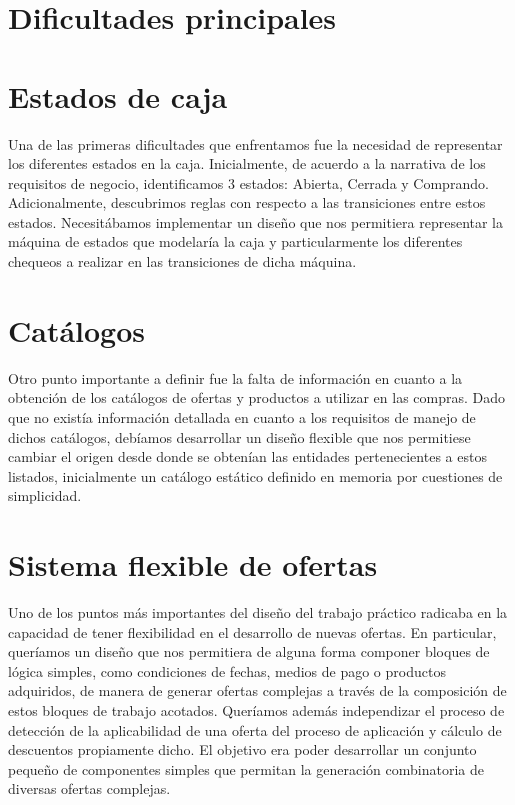 \documentclass[a4paper,11pt]{article}
\begin{document}
\section{Dificultades principales}

\section{Estados de caja}

Una de las primeras dificultades que enfrentamos fue la necesidad de
representar los diferentes estados en la caja. Inicialmente, de acuerdo a la
narrativa de los requisitos de negocio, identificamos 3 estados: Abierta,
Cerrada y Comprando. Adicionalmente, descubrimos reglas con respecto a las
transiciones entre estos estados. Necesitábamos implementar un diseño que nos
permitiera representar la máquina de estados que modelaría la caja y
particularmente los diferentes chequeos a realizar en las transiciones de dicha
máquina.

\section{Catálogos}

Otro punto importante a definir fue la falta de información en cuanto a la
obtención de los catálogos de ofertas y productos a utilizar en las compras.
Dado que no existía información detallada en cuanto a los requisitos de manejo
de dichos catálogos, debíamos desarrollar un diseño flexible que nos permitiese
cambiar el origen desde donde se obtenían las entidades pertenecientes a estos
listados, inicialmente un catálogo estático definido en memoria por cuestiones
de simplicidad.

\section{Sistema flexible de ofertas}

Uno de los puntos más importantes del diseño del trabajo práctico radicaba en
la capacidad de tener flexibilidad en el desarrollo de nuevas ofertas. En
particular, queríamos un diseño que nos permitiera de alguna forma componer
bloques de lógica simples, como condiciones de fechas, medios de pago o
productos adquiridos, de manera de generar ofertas complejas a través de la
composición de estos bloques de trabajo acotados. Queríamos además independizar
el proceso de detección de la aplicabilidad de una oferta del proceso de
aplicación y cálculo de descuentos propiamente dicho. El objetivo era poder
desarrollar un conjunto pequeño de componentes simples que permitan la
generación combinatoria de diversas ofertas complejas.
\end{document}
